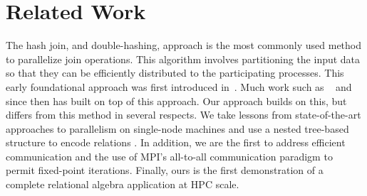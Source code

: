 
\section{Related Work}
\label{sec:related}









The hash join, and double-hashing, approach is the most commonly used method to parallelize join
operations. This algorithm involves partitioning the input data so that they can be efficiently distributed
to the participating processes. This early foundational approach was first introduced in~\cite{Valduriez:1988:PET:54616.54618}. Much work such as ~\cite{Cheiney:1990:PST:94362.94445} and ~\cite{Cacace:1991:OPS:111828.111831} since then has built on top of this approach. Our approach builds on this, but differs from this method in several respects. We take lessons from state-of-the-art approaches to parallelism on single-node machines and use a nested tree-based structure to encode relations \cite{btree-ppopp,brie-pmam}. In addition, we are the first to address efficient communication and the use of MPI's all-to-all communication paradigm to permit fixed-point iterations. Finally, ours is the first demonstration of a complete relational algebra application at HPC scale.   

